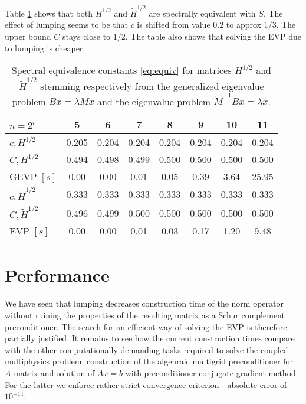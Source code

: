 \documentclass[10pt, a4paper]{article}
\begin{document}
Table \ref{tab:lump} shows that both $H^{1/2}$ and $\tilde{H}^{1/2}$ are
spectrally equivalent with $S$. The effect of lumping seems to be that $c$ is
shifted from value 0.2 to approx $1/3$. The upper bound $C$ stays close to
$1/2$. The table also shows that solving the EVP due to lumping is cheaper. 
%
\begin{table}[ht]
  \caption{Spectral equivalence constants \eqref{eq:equiv} for matrices
  $H^{1/2}$ and $\tilde{H}^{1/2}$ stemming respectively from the generalized
eigenvalue problem $Bx=\lambda M x$ and the eigenvalue problem
$\tilde{M}^{-1}Bx=\lambda x$.}
\label{tab:lump}
\footnotesize{
\begin{tabular}{l|ccccccc}
$n=2^i$              &     5 &     6 &     7 &     8 &     9 & 10    & 11\\
\hline
$c, H^{1/2}$         & 0.205 & 0.204 & 0.204 & 0.204 & 0.204 & 0.204 & 0.204\\
$C, H^{1/2}$         & 0.494 & 0.498 & 0.499 & 0.500 & 0.500 & 0.500 & 0.500\\
GEVP $\left[s\right]$&  0.00 & 0.00  & 0.01  & 0.05  & 0.39  & 3.64  & 25.95\\
\hline
$c, \tilde{H}^{1/2}$ & 0.333 & 0.333 & 0.333 & 0.333 & 0.333 & 0.333 & 0.333\\
$C, \tilde{H}^{1/2}$ & 0.496 & 0.499 & 0.500 & 0.500 & 0.500 & 0.500 & 0.500\\
EVP $\left[s\right]$ & 0.00  & 0.00  & 0.01  & 0.03  & 0.17  & 1.20  & 9.48\\
\end{tabular}
}
\end{table}

\section*{Performance} We have seen that lumping decreases construction time of
the norm operator without ruining the properties of the resulting matrix as a
Schur complement preconditioner. The search for an efficient way of solving the
EVP is therefore partially justified. It remains to see how the current
construction times compare with the other computationally demanding tasks
required to solve the coupled multiphysics problem: construction of the
algebraic multigrid preconditioner for $A$ matrix and solution of $Ax=b$ with
preconditioner conjugate gradient method. For the latter we enforce rather
strict convergence criterion - absolute error of $10^{-14}$.
\end{document}
